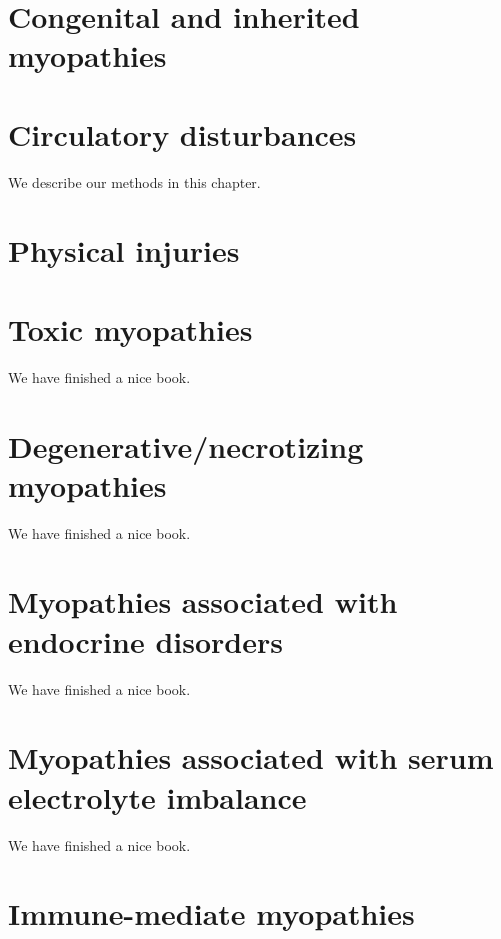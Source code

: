 \documentclass[openany]{book}
\begin{document}
\chapter{Congenital and inherited
myopathies}\label{congenital-and-inherited-myopathies}

\chapter{Circulatory disturbances}\label{circulatory-disturbances}

We describe our methods in this chapter.

\chapter{Physical injuries}\label{physical-injuries}

\chapter{Toxic myopathies}\label{toxic-myopathies}

We have finished a nice book.

\chapter{Degenerative/necrotizing
myopathies}\label{degenerativenecrotizing-myopathies}

We have finished a nice book.

\chapter{Myopathies associated with endocrine
disorders}\label{myopathies-associated-with-endocrine-disorders}

We have finished a nice book.

\chapter{Myopathies associated with serum electrolyte
imbalance}\label{myopathies-associated-with-serum-electrolyte-imbalance}

We have finished a nice book.

\chapter{Immune-mediate myopathies}\label{immune-mediate-myopathies}
\end{document}

